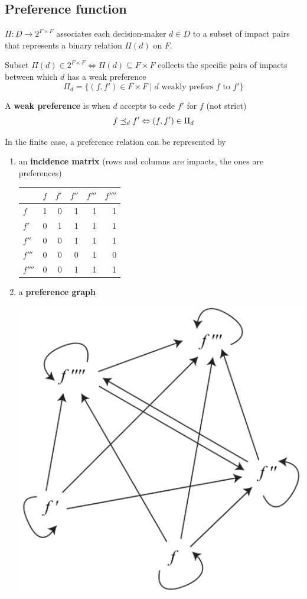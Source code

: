 \subsection{Preference function}
\label{subsec:preffunctiondef}

$\Pi: D \rightarrow 2^{F \times F}$ associates each decision-maker $d \in D$ to a subset of impact pairs that represents a binary relation $\Pi (d)$ on $F$.

Subset $\Pi(d) \in 2^{F \times F} \Leftrightarrow \Pi(d) \subseteq F \times F$ collects the specific pairs of impacts between which $d$ has a weak preference
$$ \Pi_d = \{(f, f') \in F \times F \mid d \text{ weakly prefers } f \text{ to } f'\} $$

\begin{definition}
	A \textbf{weak preference} is when $d$ accepts to cede $f'$ for $f$ (not strict)
	$$ f \preceq_{d} f' \Leftrightarrow (f, f') \in \Pi_d$$
\end{definition} 

In the finite case, a preference relation can be represented by
\begin{enumerate}
	\item an \textbf{incidence matrix} (rows and columns are impacts, the ones are preferences)
	\begin{center}
		\begin{tabular}{@{}l|rrrrr@{}}
			\toprule
			& $f$ & $f'$ & $f''$ & $f'''$ & $f''''$ \\
			\midrule
			$f$   & 1 &  0 & 1 & 1 & 1 \\
			$f'$  & 0 & 1 & 1 & 1 & 1 \\
			$f''$  & 0 &  0 & 1 &  1 & 1 \\
			$f'''$ & 0 &  0 & 0 & 1 & 0 \\
			$f''''$ & 0 & 0 & 1 & 1 & 1 \\
			\bottomrule
		\end{tabular}
	\end{center}
	
	\item a \textbf{preference graph}
	\begin{center}
		\includegraphics[width=0.45\columnwidth]{img/dp/fundamentaldefinitions/graph1}
	\end{center}
\end{enumerate}


